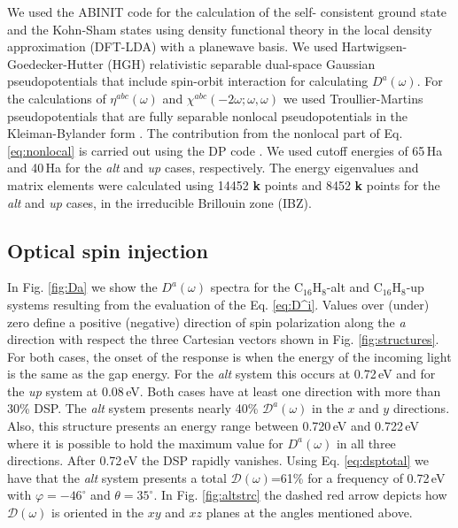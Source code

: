 \documentclass[pss]{wiley2sp} %
\begin{document}
We used the ABINIT code \cite{gonzeCPC09} for the calculation of the self-
consistent ground state and the Kohn-Sham states using density functional
theory in the local density approximation (DFT-LDA) with a planewave basis. We
used Hartwigsen-Goedecker-Hutter (HGH) relativistic separable dual-space
Gaussian pseudopotentials \cite{hartwigsenPRB98}that include spin-orbit
interaction for calculating $D^{a}(\omega)$. For the calculations of
{$\eta^{abc}(\omega)$} and $\chi^{abc}(-2\omega;\omega,\omega)$ we used
Troullier-Martins pseudopotentials \cite{troullierPRB91} that are fully
separable nonlocal pseudopotentials in the Kleiman-Bylander form
\cite{kleinmanPRL82}. The contribution from the nonlocal part of Eq.
\eqref{eq:nonlocal} is carried out using the DP code \cite{olevanoDP}. We used
cutoff energies of 65\,Ha and 40\,Ha for the \emph{alt} and \emph{up} cases,
respectively. The energy eigenvalues and matrix elements were calculated using
14452 \textbf{k} points and 8452 \textbf{k} points for the \emph{alt} and
\emph{up} cases, in the irreducible Brillouin zone (IBZ).


\subsection{Optical spin injection}\label{subsec:results-DSP}

In Fig. \ref{fig:Da} we show the $D^{a}(\omega)$ spectra for the
C$_{16}$H$_{8}$-alt and C$_{16}$H$_{8}$-up systems resulting from the
evaluation of the Eq. \eqref{eq:D^i}. Values over (under) zero define a
positive (negative) direction of spin polarization along the \emph{a}
direction with respect the three Cartesian vectors shown in Fig.
\ref{fig:structures}. For both cases, the onset of the response is when the
energy of the incoming light is the same as the gap energy. For the \emph{alt}
system this occurs at 0.72\,eV and for the \emph{up} system at 0.08\,eV. Both
cases have at least one direction with more than 30\% DSP. The \emph{alt}
system presents nearly 40\% $\mathcal{D}^{a}(\omega)$ in the $x$ and $y$
directions. Also, this structure presents an energy range between 0.720\,eV
and 0.722\,eV where it is possible to hold the maximum value for
$D^{a}(\omega)$ in all three directions. After 0.72\,eV the DSP rapidly
vanishes. Using Eq. \eqref{eq:dsptotal} we have that the \emph{alt} system
presents a total $\mathcal{D}(\omega)$=61\% for a frequency of 0.72\,eV with
$\varphi=-46^{\circ}$ and $\theta=35^{\circ}$. In Fig. \ref{fig:altstrc} the
dashed red arrow depicts how $\mathcal{D}(\omega)$ is oriented in the $xy$ and
$xz$ planes at the angles mentioned above.
\end{document}
